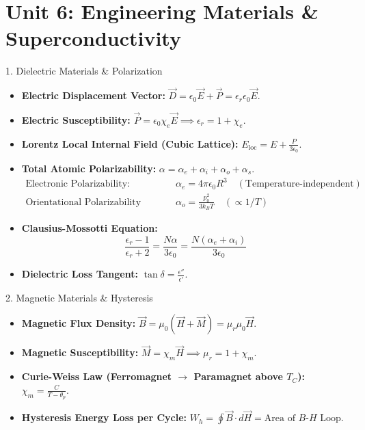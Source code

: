 \chapter{Unit 6: Engineering Materials \& Superconductivity}

\begin{formulabox}{1. Dielectric Materials \& Polarization}
\begin{itemize}[leftmargin=*,itemsep=2pt]
    \item \textbf{Electric Displacement Vector:} $\vec{D} = \epsilon_0 \vec{E} + \vec{P} = \epsilon_r \epsilon_0 \vec{E}$.
    \item \textbf{Electric Susceptibility:} $\vec{P} = \epsilon_0 \chi_e \vec{E} \implies \epsilon_r = 1 + \chi_e$.
    \item \textbf{Lorentz Local Internal Field (Cubic Lattice):} $E_{\text{loc}} = E + \frac{P}{3\epsilon_0}$.
    \item \textbf{Total Atomic Polarizability:} $\alpha = \alpha_e + \alpha_i + \alpha_o + \alpha_s$.
    \begin{align*}
    \text{Electronic Polarizability:} \quad & \alpha_e = 4\pi\epsilon_0 R^3 \quad (\text{Temperature-independent}) \\
    \text{Orientational Polarizability (Langevin):} \quad & \alpha_o = \frac{p_0^2}{3 k_B T} \quad (\propto 1/T)
    \end{align*}
    \item \textbf{Clausius-Mossotti Equation:}
    \[
    \frac{\epsilon_r - 1}{\epsilon_r + 2} = \frac{N \alpha}{3\epsilon_0} = \frac{N (\alpha_e + \alpha_i)}{3\epsilon_0}
    \]
    \item \textbf{Dielectric Loss Tangent:} $\tan\delta = \frac{\epsilon''}{\epsilon'}$.
\end{itemize}
\end{formulabox}

\begin{formulabox}{2. Magnetic Materials \& Hysteresis}
\begin{itemize}[leftmargin=*,itemsep=2pt]
    \item \textbf{Magnetic Flux Density:} $\vec{B} = \mu_0(\vec{H} + \vec{M}) = \mu_r \mu_0 \vec{H}$.
    \item \textbf{Magnetic Susceptibility:} $\vec{M} = \chi_m \vec{H} \implies \mu_r = 1 + \chi_m$.
    \item \textbf{Curie-Weiss Law (Ferromagnet $\to$ Paramagnet above $T_C$):} $\chi_m = \frac{C}{T - \theta_p}$.
    \item \textbf{Hysteresis Energy Loss per Cycle:} $W_h = \oint \vec{B}\cdot d\vec{H} = \text{Area of } B\text{-}H \text{ Loop}$.
\end{itemize}
\end{formulabox}

